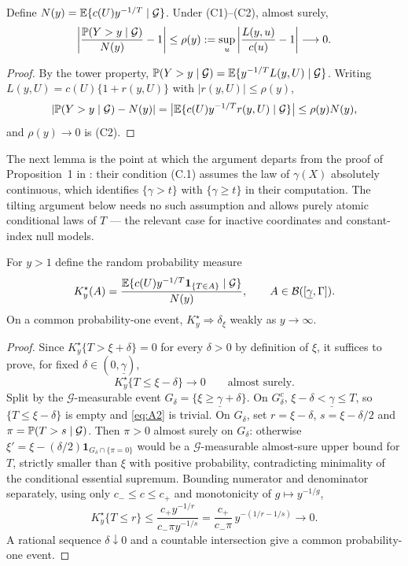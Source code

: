 \begin{lemma}\label{lem:app-remainder}
Define $N(y)=\mathbb E\{c(U)y^{-1/T}\mid\mathcal G\}$.  Under (C1)--(C2), almost
surely,
\begin{equation}
 \left|\frac{\mathbb P(Y>y\mid\mathcal G)}{N(y)}-1\right|
 \le\rho(y):=\sup_u\left|\frac{L(y,u)}{c(u)}-1\right|\longrightarrow0.
 \label{eq:A1}
\end{equation}
\end{lemma}

\begin{proof}
By the tower property,
$\mathbb P(Y>y\mid\mathcal G)=\mathbb E\{y^{-1/T}L(y,U)\mid\mathcal G\}$.  Writing
$L(y,U)=c(U)\{1+r(y,U)\}$ with $|r(y,U)|\le\rho(y)$,
\[
 |\mathbb P(Y>y\mid\mathcal G)-N(y)|
 =\bigl|\mathbb E\{c(U)y^{-1/T}r(y,U)\mid\mathcal G\}\bigr|
 \le\rho(y)N(y),
\]
and $\rho(y)\to0$ is (C2).
\end{proof}

The next lemma is the point at which the argument departs from the proof
of Proposition~1 in \citet{gardesPodgorny2025}: their condition (C.1)
assumes the law of $\gamma(X)$ absolutely continuous, which identifies
$\{\gamma>t\}$ with $\{\gamma\ge t\}$ in their computation.  The tilting
argument below needs no such assumption and allows purely atomic
conditional laws of $T$ --- the relevant case for inactive coordinates
and constant-index null models.

\begin{lemma}\label{lem:app-tilt}
For $y>1$ define the random probability measure
\[
 K_y^\star(A)=
 \frac{\mathbb E\{c(U)y^{-1/T}\mathbf 1_{\{T\in A\}}\mid\mathcal G\}}{N(y)},
 \qquad A\in\mathcal B([\underline\gamma,\Gamma]).
\]
On a common probability-one event, $K_y^\star\Rightarrow\delta_\xi$ weakly
as $y\to\infty$.
\end{lemma}

\begin{proof}
Since $K_y^\star\{T>\xi+\delta\}=0$ for every $\delta>0$ by definition of
$\xi$, it suffices to prove, for fixed
$\delta\in(0,\underline\gamma)$,
\begin{equation}
 K_y^\star\{T\le\xi-\delta\}\longrightarrow0\qquad\text{almost surely.}
 \label{eq:A2}
\end{equation}
Split by the $\mathcal G$-measurable event
$G_\delta=\{\xi\ge\underline\gamma+\delta\}$.  On $G_\delta^c$,
$\xi-\delta<\underline\gamma\le T$, so $\{T\le\xi-\delta\}$ is empty and
\eqref{eq:A2} is trivial.  On $G_\delta$, set $r=\xi-\delta$,
$s=\xi-\delta/2$ and $\pi=\mathbb P(T>s\mid\mathcal G)$.  Then $\pi>0$ almost
surely on $G_\delta$: otherwise
$\xi'=\xi-(\delta/2)\mathbf 1_{G_\delta\cap\{\pi=0\}}$ would be a
$\mathcal G$-measurable almost-sure upper bound for $T$, strictly smaller
than $\xi$ with positive probability, contradicting minimality of the
conditional essential supremum.  Bounding numerator and denominator
separately, using only $c_-\le c\le c_+$ and monotonicity of
$g\mapsto y^{-1/g}$,
\[
 K_y^\star\{T\le r\}
 \le\frac{c_+y^{-1/r}}{c_-\pi y^{-1/s}}
 =\frac{c_+}{c_-\pi}\,y^{-(1/r-1/s)}\longrightarrow0.
\]
A rational sequence $\delta\downarrow0$ and a countable intersection give
a common probability-one event.
\end{proof}


